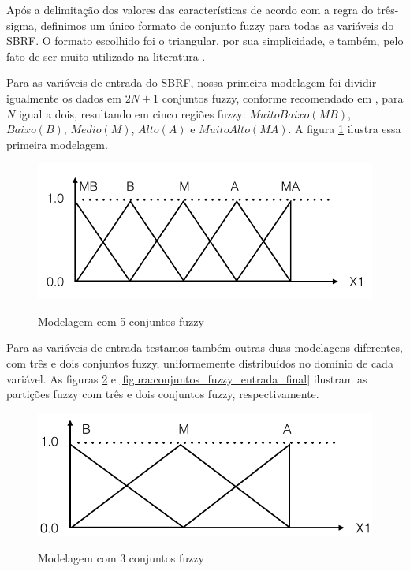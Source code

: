 \documentclass[template.tex]{subfiles}
\begin{document}
Após a delimitação dos valores das características de acordo com a regra do três-sigma, definimos um único formato de conjunto fuzzy para todas as variáveis do SBRF. O formato escolhido foi o triangular, por sua simplicidade, e também, pelo fato de ser muito utilizado na literatura \cite{alcala2009multiobjective, gacto2010integration, antonelli2012multi, cardenas2012multiobjective}.

Para as variáveis de entrada do SBRF, nossa primeira modelagem foi dividir igualmente os dados em $2N + 1$ conjuntos fuzzy, conforme recomendado em \cite{wang1992generating}, para $N$ igual a dois, resultando em cinco regiões fuzzy: $Muito Baixo (MB)$, $Baixo (B)$, $Medio (M)$, $Alto (A)$ e $Muito Alto (MA)$. A figura \ref{figura:cinco_conjuntos_fuzzy} ilustra essa primeira modelagem.

\begin{figure}[H]
\caption{Modelagem com 5 conjuntos fuzzy}
\centering
\includegraphics[scale=0.45]{cinco_conjuntos_fuzzy.png}
\label{figura:cinco_conjuntos_fuzzy}
\end{figure}

Para as variáveis de entrada testamos também outras duas modelagens diferentes, com três e dois conjuntos fuzzy, uniformemente distribuídos no domínio de cada variável. As figuras \ref{figura:tres_conjuntos_fuzzy} e \ref{figura:conjuntos_fuzzy_entrada_final} ilustram as partições fuzzy com três e dois conjuntos fuzzy, respectivamente.

\begin{figure}[H]
\caption{Modelagem com 3 conjuntos fuzzy}
\centering
\includegraphics[scale=0.45]{tres_conjuntos_fuzzy.png}
\label{figura:tres_conjuntos_fuzzy}
\end{figure}
\end{document}
